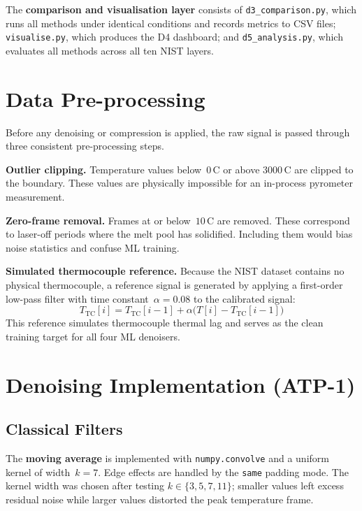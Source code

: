 The \textbf{comparison and visualisation layer} consists of
\texttt{d3\_comparison.py}, which runs all methods under identical conditions and
records metrics to CSV files; \texttt{visualise.py}, which produces the D4
dashboard; and \texttt{d5\_analysis.py}, which evaluates all methods across all
ten NIST layers.

\section{Data Pre-processing}
\label{sec:preprocessing}

Before any denoising or compression is applied, the raw signal is passed through
three consistent pre-processing steps.

\textbf{Outlier clipping.} Temperature values below~$0$\,\textdegree C or above
$3000$\,\textdegree C are clipped to the boundary. These values are physically
impossible for an in-process pyrometer measurement.

\textbf{Zero-frame removal.} Frames at or below~$10$\,\textdegree C are removed.
These correspond to laser-off periods where the melt pool has solidified.
Including them would bias noise statistics and confuse ML training.

\textbf{Simulated thermocouple reference.} Because the NIST dataset contains no
physical thermocouple, a reference signal is generated by applying a first-order
low-pass filter with time constant~$\alpha = 0.08$ to the calibrated signal:
\begin{equation}
T_\text{TC}[i] = T_\text{TC}[i-1] +
  \alpha\bigl(T[i] - T_\text{TC}[i-1]\bigr)
\label{eq:lpf-impl}
\end{equation}
This reference simulates thermocouple thermal lag and serves as the clean
training target for all four ML denoisers.

\section{Denoising Implementation (ATP-1)}
\label{sec:impl-denoise}

\subsection{Classical Filters}

The \textbf{moving average} is implemented with \texttt{numpy.convolve} and a
uniform kernel of width~$k = 7$. Edge effects are handled by the \texttt{same}
padding mode. The kernel width was chosen after testing $k \in \{3, 5, 7, 11\}$;
smaller values left excess residual noise while larger values distorted the peak
temperature frame.

